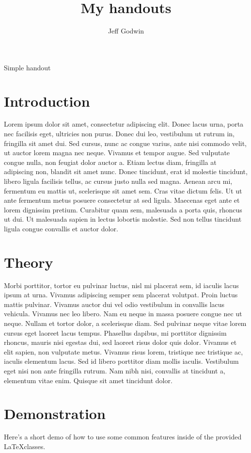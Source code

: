 
\author{Jeff Godwin}
\title{My handouts}{Simple handout}


\section{Introduction}

Lorem ipsum dolor sit amet, consectetur adipiscing elit. Donec lacus urna, porta nec facilisis eget, ultricies non purus. Donec dui leo, vestibulum ut rutrum in, fringilla sit amet dui. Sed cursus, nunc ac congue varius, ante nisi commodo velit, ut auctor lorem magna nec neque. Vivamus et tempor augue. Sed vulputate congue nulla, non feugiat dolor auctor a. Etiam lectus diam, fringilla at adipiscing non, blandit sit amet nunc. Donec tincidunt, erat id molestie tincidunt, libero ligula facilisis tellus, ac cursus justo nulla sed magna. Aenean arcu mi, fermentum eu mattis ut, scelerisque sit amet sem. Cras vitae dictum felis. Ut ut ante fermentum metus posuere consectetur at sed ligula. Maecenas eget ante et lorem dignissim pretium. Curabitur quam sem, malesuada a porta quis, rhoncus ut dui. Ut malesuada sapien in lectus lobortis molestie. Sed non tellus tincidunt ligula congue convallis et auctor dolor.

\section{Theory}
Morbi porttitor, tortor eu pulvinar luctus, nisl mi placerat sem, id iaculis lacus ipsum at urna. Vivamus adipiscing semper sem placerat volutpat. Proin luctus mattis pulvinar. Vivamus auctor dui vel odio vestibulum in convallis lacus vehicula. Vivamus nec leo libero. Nam eu neque in massa posuere congue nec ut neque. Nullam et tortor dolor, a scelerisque diam. Sed pulvinar neque vitae lorem cursus eget laoreet lacus tempus. Phasellus dapibus, mi porttitor dignissim rhoncus, mauris nisi egestas dui, sed laoreet risus dolor quis dolor. Vivamus et elit sapien, non vulputate metus. Vivamus risus lorem, tristique nec tristique ac, iaculis elementum lacus. Sed id libero porttitor diam mollis iaculis. Vestibulum eget nisi non ante fringilla rutrum. Nam nibh nisi, convallis at tincidunt a, elementum vitae enim. Quisque sit amet tincidunt dolor.

\section{Demonstration}
Here's a short demo of how to use some common features inside of the provided \LaTeX classes.

